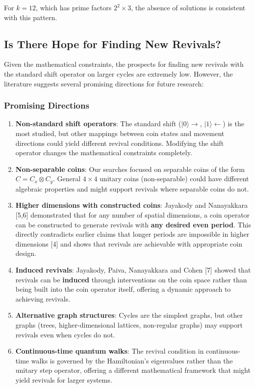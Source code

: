 \documentclass[12pt]{article}
\begin{document}
For $k=12$, which has prime factors $2^2 \times 3$, the absence of solutions is consistent with this pattern.

\subsection{Is There Hope for Finding New Revivals?}

Given the mathematical constraints, the prospects for finding new revivals with the standard shift operator on larger cycles are extremely low. However, the literature suggests several promising directions for future research:

\subsubsection{Promising Directions}

\begin{enumerate}
    \item \textbf{Non-standard shift operators}: The standard shift ($|0\rangle \rightarrow$, $|1\rangle \leftarrow$) is the most studied, but other mappings between coin states and movement directions could yield different revival conditions. Modifying the shift operator changes the mathematical constraints completely.
    
    \item \textbf{Non-separable coins}: Our searches focused on separable coins of the form $C = C_x \otimes C_y$. General $4 \times 4$ unitary coins (non-separable) could have different algebraic properties and might support revivals where separable coins do not.
    
    \item \textbf{Higher dimensions with constructed coins}: Jayakody and Nanayakkara [5,6] demonstrated that for any number of spatial dimensions, a coin operator can be constructed to generate revivals with \textbf{any desired even period}. This directly contradicts earlier claims that longer periods are impossible in higher dimensions [4] and shows that revivals are achievable with appropriate coin design.
    
    \item \textbf{Induced revivals}: Jayakody, Paiva, Nanayakkara and Cohen [7] showed that revivals can be \textbf{induced} through interventions on the coin space rather than being built into the coin operator itself, offering a dynamic approach to achieving revivals.
    
    \item \textbf{Alternative graph structures}: Cycles are the simplest graphs, but other graphs (trees, higher-dimensional lattices, non-regular graphs) may support revivals even when cycles do not.
    
    \item \textbf{Continuous-time quantum walks}: The revival condition in continuous-time walks is governed by the Hamiltonian's eigenvalues rather than the unitary step operator, offering a different mathematical framework that might yield revivals for larger systems.
\end{enumerate}
\end{document}
